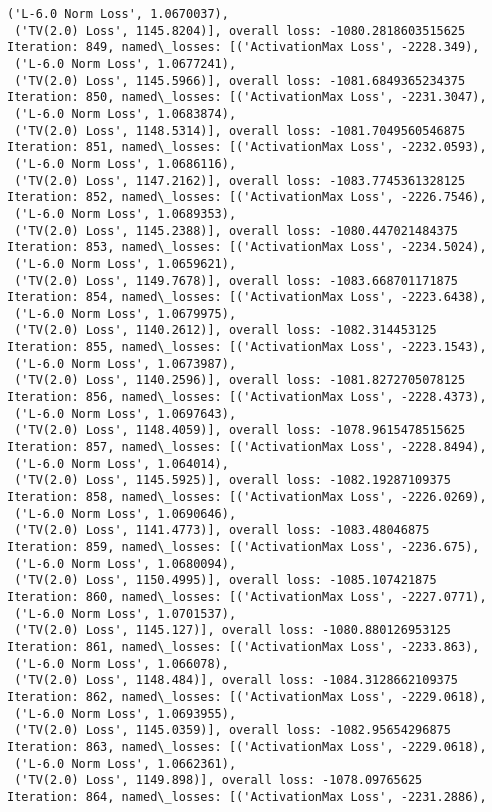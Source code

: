 \documentclass[10pt]{article}
\begin{document}
\begin{Verbatim}[commandchars=\\\{\}]
 ('L-6.0 Norm Loss', 1.0670037),
 ('TV(2.0) Loss', 1145.8204)], overall loss: -1080.2818603515625
Iteration: 849, named\_losses: [('ActivationMax Loss', -2228.349),
 ('L-6.0 Norm Loss', 1.0677241),
 ('TV(2.0) Loss', 1145.5966)], overall loss: -1081.6849365234375
Iteration: 850, named\_losses: [('ActivationMax Loss', -2231.3047),
 ('L-6.0 Norm Loss', 1.0683874),
 ('TV(2.0) Loss', 1148.5314)], overall loss: -1081.7049560546875
Iteration: 851, named\_losses: [('ActivationMax Loss', -2232.0593),
 ('L-6.0 Norm Loss', 1.0686116),
 ('TV(2.0) Loss', 1147.2162)], overall loss: -1083.7745361328125
Iteration: 852, named\_losses: [('ActivationMax Loss', -2226.7546),
 ('L-6.0 Norm Loss', 1.0689353),
 ('TV(2.0) Loss', 1145.2388)], overall loss: -1080.447021484375
Iteration: 853, named\_losses: [('ActivationMax Loss', -2234.5024),
 ('L-6.0 Norm Loss', 1.0659621),
 ('TV(2.0) Loss', 1149.7678)], overall loss: -1083.668701171875
Iteration: 854, named\_losses: [('ActivationMax Loss', -2223.6438),
 ('L-6.0 Norm Loss', 1.0679975),
 ('TV(2.0) Loss', 1140.2612)], overall loss: -1082.314453125
Iteration: 855, named\_losses: [('ActivationMax Loss', -2223.1543),
 ('L-6.0 Norm Loss', 1.0673987),
 ('TV(2.0) Loss', 1140.2596)], overall loss: -1081.8272705078125
Iteration: 856, named\_losses: [('ActivationMax Loss', -2228.4373),
 ('L-6.0 Norm Loss', 1.0697643),
 ('TV(2.0) Loss', 1148.4059)], overall loss: -1078.9615478515625
Iteration: 857, named\_losses: [('ActivationMax Loss', -2228.8494),
 ('L-6.0 Norm Loss', 1.064014),
 ('TV(2.0) Loss', 1145.5925)], overall loss: -1082.19287109375
Iteration: 858, named\_losses: [('ActivationMax Loss', -2226.0269),
 ('L-6.0 Norm Loss', 1.0690646),
 ('TV(2.0) Loss', 1141.4773)], overall loss: -1083.48046875
Iteration: 859, named\_losses: [('ActivationMax Loss', -2236.675),
 ('L-6.0 Norm Loss', 1.0680094),
 ('TV(2.0) Loss', 1150.4995)], overall loss: -1085.107421875
Iteration: 860, named\_losses: [('ActivationMax Loss', -2227.0771),
 ('L-6.0 Norm Loss', 1.0701537),
 ('TV(2.0) Loss', 1145.127)], overall loss: -1080.880126953125
Iteration: 861, named\_losses: [('ActivationMax Loss', -2233.863),
 ('L-6.0 Norm Loss', 1.066078),
 ('TV(2.0) Loss', 1148.484)], overall loss: -1084.3128662109375
Iteration: 862, named\_losses: [('ActivationMax Loss', -2229.0618),
 ('L-6.0 Norm Loss', 1.0693955),
 ('TV(2.0) Loss', 1145.0359)], overall loss: -1082.95654296875
Iteration: 863, named\_losses: [('ActivationMax Loss', -2229.0618),
 ('L-6.0 Norm Loss', 1.0662361),
 ('TV(2.0) Loss', 1149.898)], overall loss: -1078.09765625
Iteration: 864, named\_losses: [('ActivationMax Loss', -2231.2886),

\end{Verbatim}
\end{document}
